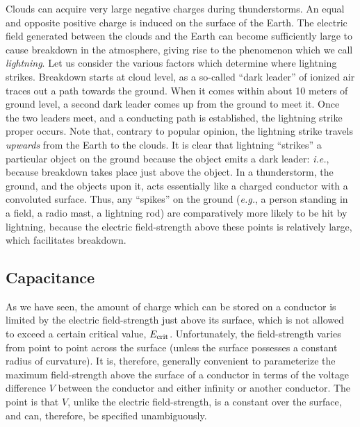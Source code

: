 Clouds can acquire very large negative charges during thunderstorms. An equal
and opposite positive charge is induced on the surface of the Earth. 
The electric field generated between the clouds and the Earth can become
sufficiently large to cause breakdown in the atmosphere, giving rise to
the phenomenon which we call {\em lightning}.  Let us consider the various factors which determine where lightning strikes. Breakdown starts
at cloud level, as a so-called ``dark leader'' of ionized air traces out a path
towards the ground. When it comes within about 10 meters of  ground level, a second
dark leader comes up from the ground to meet it. Once the two leaders meet, and
a conducting path is established, the lightning strike proper occurs.
Note that, contrary to popular opinion, the lightning strike
travels {\em upwards}\/ from
the Earth to the clouds. It is clear that lightning ``strikes'' a particular
object on the ground because the object emits a dark leader: {\em i.e.},
because breakdown takes place just above the object.
In a thunderstorm, the ground, and the
objects upon it,  acts essentially like a charged conductor with a
convoluted surface.
Thus, any ``spikes'' on the ground ({\em e.g.}, a person standing in a field,
a radio mast, a lightning rod)
are comparatively more likely to be hit by lightning, because the electric field-strength
above these points is relatively large, which facilitates breakdown.

\subsection{Capacitance}
As we have seen, the amount of charge which can be stored on a conductor is limited
by the electric field-strength  just above its surface,
which is not allowed to exceed a certain critical value, $E_{\rm crit}$. 
Unfortunately, the field-strength varies from point to point across the surface (unless the
surface possesses a constant radius of curvature). It is, therefore,
 generally convenient
to parameterize the maximum field-strength above the surface of a conductor
in terms of the voltage difference $V$ between the conductor and either
infinity or another conductor.  The point  is that $V$, unlike the electric
field-strength, is a constant over the surface, and can, therefore,  be specified unambiguously. 

